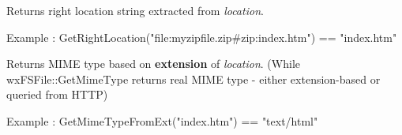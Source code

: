 \label{wxfilesystemhandlergetrightlocation}


Returns right location string extracted from {\it location}. 

Example : GetRightLocation("file:myzipfile.zip\#zip:index.htm") == "index.htm"


\label{wxfilesystemhandlergetmimetypefromext}


Returns MIME type based on {\bf extension} of {\it location}. (While wxFSFile::GetMimeType
returns real MIME type - either extension-based or queried from HTTP)

Example : GetMimeTypeFromExt("index.htm") == "text/html"

